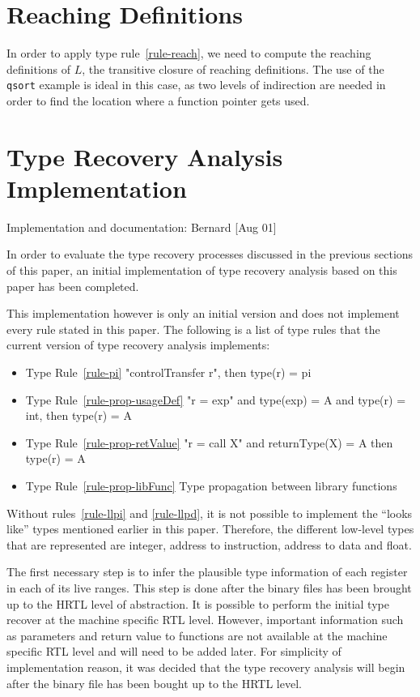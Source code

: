 \section{Reaching Definitions}
In order to apply type rule~\ref{rule-reach}, we need to compute 
the reaching definitions of $L$, the transitive closure of 
reaching definitions.  The use of the \texttt{qsort} example 
is ideal in this case, as two levels of indirection are needed 
in order to find the location where a function pointer gets used. 


\section{Type Recovery Analysis Implementation}

{\small
\begin{flushright}
Implementation and documentation: Bernard [Aug 01]
\end{flushright}
}

In order to evaluate the type recovery processes discussed in the previous
sections of this paper, an initial implementation of type recovery
analysis based on this paper has been completed.

This implementation however is only an initial version and does not
implement every rule stated in this paper. The following is a list of 
type rules that the current version of type recovery analysis implements:

\begin{itemize}
\item Type Rule~\ref{rule-pi} "controlTransfer r", then type(r) = pi
\item Type Rule~\ref{rule-prop-usageDef} "r = exp" and type(exp) = A and 
	type(r) = int, then type(r) = A
\item Type Rule~\ref{rule-prop-retValue} "r = call X" and returnType(X) = A 
	then type(r) = A
\item Type Rule~\ref{rule-prop-libFunc} Type propagation between library 
	functions
\end{itemize}

Without rules~\ref{rule-llpi} and \ref{rule-llpd}, it is not possible to 
implement the ``looks like'' types mentioned earlier in this paper.  
Therefore, the different low-level types that are represented are integer, 
address to instruction, address to data and float.

The first necessary step is to infer the plausible type information of each 
register in each of its live ranges. This step is done after the binary
files has been brought up to the HRTL level of abstraction. It is possible
to perform the initial type recover at the machine specific RTL level. However,
important information such as parameters and return value to functions are not 
available at the machine specific RTL level and will need to be added later. 
For simplicity of implementation reason, it was decided that the type recovery 
analysis will begin after the binary file has been bought up to the HRTL level.

